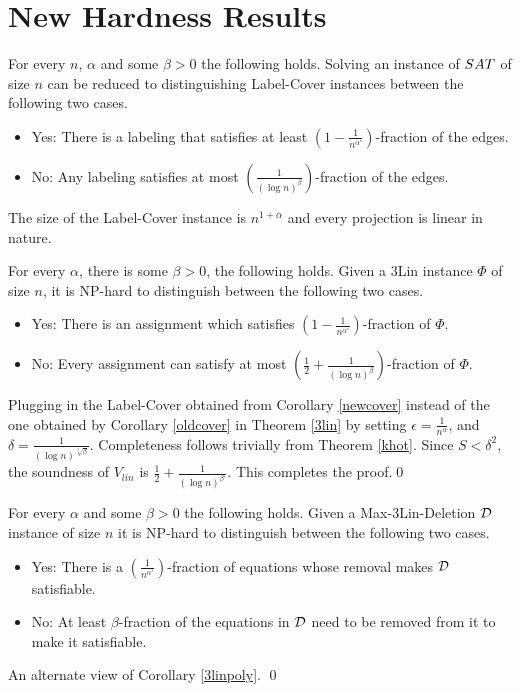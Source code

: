\section{New Hardness Results}
\begin{corollary} \label{newcover}
  For every $n$, $\alpha$ and some $\beta > 0$ the following
  holds. Solving an instance of ${\sc SAT}$ of size $n$ can be reduced
  to distinguishing {\sc Label-Cover} instances 
  between the following two cases.
\begin{itemize}
\item {\sf Yes:} There is a labeling that satisfies at least $(1 -
		\frac{1}{n^{\alpha'}})$-fraction of the edges.
\item {\sf No:} Any labeling satisfies at most $(\frac{1}{(\log n)^\beta})$-fraction of the edges.
\end{itemize}
The size of the {\sc Label-Cover} instance is $n^{1 + \alpha}$ and every projection is linear in nature.
\end{corollary}

\begin{corollary} \label{3linpoly} For every
  $\alpha$, there is some $\beta > 0$, the following holds. Given a
  {\sc 3Lin} instance $\Phi$ of size $n$, it is {\sf NP}-hard to
  distinguish between the following two cases.
\begin{itemize}
\item {\sf Yes:} There is an assignment which satisfies $(1 -
		\frac{1}{n^{\alpha'}})$-fraction of $\Phi$.
\item {\sf No:} Every assignment can satisfy at most $(\frac{1}{2} +
    \frac{1}{(\log n)^{\beta}})$-fraction of $\Phi$.
\end{itemize}
\end{corollary}
 Plugging in the {\sc Label-Cover} obtained from
Corollary \ref{newcover} instead of the one obtained by Corollary
\ref{oldcover} in Theorem \ref{3lin} by setting 
$\epsilon = \frac{1}{n^\alpha}$, and $\delta = \frac{1}{(\log
n)^{\sqrt[3]{\beta}}}$.  Completeness follows trivially from Theorem
\ref{khot}. Since $S < \delta^2$, the soundness of $V_{lin}$ is $\frac{1}{2} +
\frac{1}{(\log n)^{\beta'}}$. This completes the proof.\qed

\begin{corollary} \label{3delpoly}
  For every $\alpha$ and some $\beta > 0$ the following holds. Given a
  {\sc Max-3Lin-Deletion} ${\cal D}$ instance of size $n$ it is {\sf
    NP}-hard to distinguish between the following two cases.
\begin{itemize}
\item {\sf Yes:} There is a $(\frac{1}{n^{\alpha'}})$-fraction of
  equations whose removal makes ${\cal D}$ satisfiable.
\item {\sf No:} At least $\beta$-fraction of the equations in ${\cal
    D}$ need to be removed from it to make it satisfiable.
\end{itemize}
\end{corollary}
 An alternate view of Corollary \ref{3linpoly}. \qed \\

